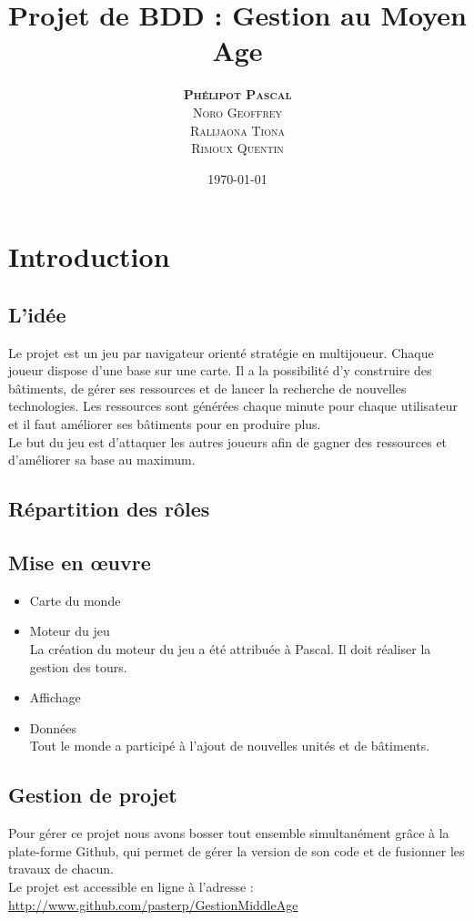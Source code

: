 \documentclass[11pt,a4paper]{article}
\author{\textsc{\textbf{Phélipot Pascal}}\\\textsc{Noro Geoffrey}\\\textsc{Ralijaona Tiona}\\\textsc{Rimoux Quentin}}
\title{Projet de BDD : Gestion au Moyen Age}
\date\today
\begin{document}
\maketitle
\pagestyle{plain}
\newpage{}
\tableofcontents

\newpage{}
\section{Introduction}
\subsection{L'idée}
Le projet est un jeu par navigateur orienté stratégie en multijoueur. 
Chaque joueur dispose d'une base sur une carte. Il a la possibilité d'y construire des bâtiments, de gérer ses ressources et de lancer la recherche de nouvelles technologies.
Les ressources sont générées chaque minute pour chaque utilisateur et il faut améliorer ses bâtiments pour en produire plus. \\
Le but du jeu est d'attaquer les autres joueurs afin de gagner des ressources et d'améliorer sa base au maximum. \\


\subsection{Répartition des rôles}
\subsection{Mise en œuvre}
\begin{itemize}
	\item Carte du monde 
	\item Moteur du jeu \\
	La création du moteur du jeu a été attribuée à Pascal. Il doit réaliser la gestion des tours.
	\item Affichage

	\item Données \\
	Tout le monde a participé à l'ajout de nouvelles unités et de bâtiments.
\end{itemize}
\subsection{Gestion de projet}
Pour gérer ce projet nous avons bosser tout ensemble simultanément grâce à la plate-forme Github, qui permet de gérer la version de son code et de fusionner les travaux de chacun.\\
Le projet est accessible en ligne à l'adresse :  \url{http://www.github.com/pasterp/GestionMiddleAge}
\end{document}
